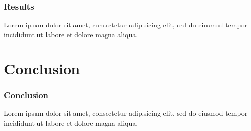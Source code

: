 \documentclass[xcolor=dvipsnames,9pt]{beamer}
\newcommand{\RE}{Results}
\newcommand{\CO}{Conclusion}
\begin{document}
  \begin{frame}
    \frametitle{\RE}
    Lorem ipsum dolor sit amet, consectetur adipisicing elit, sed do eiusmod tempor incididunt ut labore et dolore magna aliqua.
  \end{frame}

  \section{\CO}
  \begin{frame}
    \frametitle{\CO}
    Lorem ipsum dolor sit amet, consectetur adipisicing elit, sed do eiusmod tempor incididunt ut labore et dolore magna aliqua.
  \end{frame}


%
%
\end{document}
